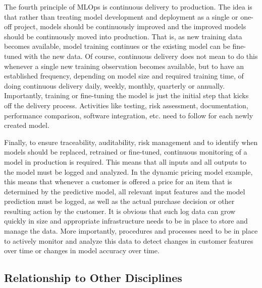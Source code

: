 The fourth principle of MLOps is continuous delivery to production. The idea is that rather than treating model development and deployment as a single or one-off project, models should be continuously improved and the improved models should be continuously moved into production. That is, as new training data becomes available, model training continues or the existing model can be fine-tuned with the new data. Of course, continuous delivery does not mean to do this whenever a single new training observation becomes available, but to have an established frequency, depending on model size and required training time, of doing continuous delivery daily, weekly, monthly, quarterly or annually. Importantly, training or fine-tuning the model is just the initial step that kicks off the delivery process. Activities like testing, risk assessment, documentation, performance comparison, software integration, etc. need to follow for each newly created model.

Finally, to ensure traceability, auditability, risk management and to identify when models should be replaced, retrained or fine-tuned, continuous monitoring of a model in production is required. This means that all inputs and all outputs to the model must be logged and analyzed. In the dynamic pricing model example, this means that whenever a customer is offered a price for an item that is determined by the predictive model, all relevant input features and the model prediction must be logged, as well as the actual purchase decision or other resulting action by the customer. It is obvious that such log data can grow quickly in size and appropriate infrastructure needs to be in place to store and manage the data. More importantly, procedures and processes need to be in place to actively monitor and analyze this data to detect changes in customer features over time or changes in model accuracy over time. 

\subsection*{Relationship to Other Disciplines}

